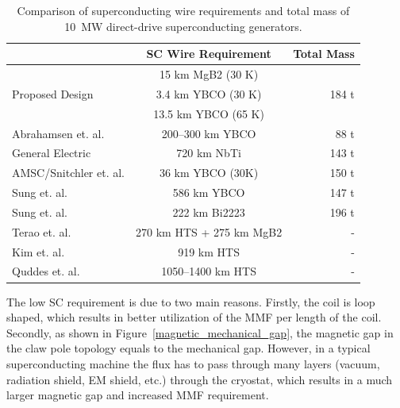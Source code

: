\documentclass[12pt]{iopart}
\begin{document}
\begin{table}[]
\caption{Comparison of superconducting wire requirements and total mass of 10~MW direct-drive superconducting generators.}
\label{SC_length_compare}
\centering
\begin{tabular}{lcr}
\hline
 & SC Wire Requirement & Total Mass \\
\hline
		& 15 km MgB2 (30 K) & \\
Proposed Design	& 3.4 km YBCO (30 K) & 184 t\\
 		& 13.5 km YBCO (65 K) & \\
\hline
\hline
Abrahamsen et. al. \cite{Abrahamsen2010} & 200--300 km YBCO &88 t\\
General Electric \cite{Fair2012} & 720 km NbTi & 143 t \\
AMSC/Snitchler et. al. \cite{Snitchler2011}  & 36 km YBCO (30K) & 150 t \\
Sung et. al. \cite{Sung2013} & 586 km YBCO & 147 t \\
Sung et. al. \cite{Sung2013}& 222 km Bi2223 & 196 t \\
Terao et. al. \cite{Terao2012} & 270 km HTS + 275 km MgB2 & - \\
Kim et. al. \cite{Song2012}& 919 km HTS & - \\
Quddes et. al. \cite{Quddes2011} & 1050--1400 km HTS & - \\
\hline
\end{tabular}
\end{table}

The low SC requirement is due to two main reasons. Firstly, the coil is loop shaped, which results in better utilization of the MMF per length of the coil. Secondly, as shown in Figure~\ref{magnetic_mechanical_gap}, the magnetic gap in the claw pole topology equals to the mechanical gap. However, in a typical superconducting machine the flux has to pass through many layers (vacuum, radiation shield, EM shield, etc.) through the cryostat, which results in a much larger magnetic gap and increased MMF requirement.
\end{document}
